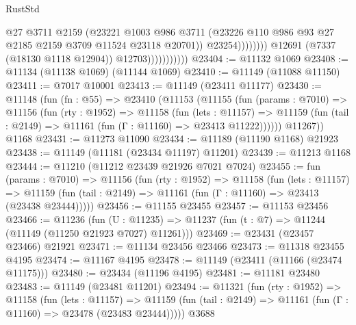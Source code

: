\begin{lexlean}{RustStd}
\begin{coremodule}
                                          @27
                                          @3711
                                          @2159
                                          (@23221
                                            @1003
                                            @986
                                            @3711
                                            (@23226
                                              @110
                                              @986
                                              @93
                                              @27
                                              @2185
                                              @2159
                                              @3709
                                              @11524
                                              @23118
                                              @20701))
                                          @23254))))))))
                          @12691
                          (@7337 (@18130 @1118 @12904))
                          @12703)))))))))))
@23404 := @11132 @1069
@23408 := @11134 (@11138 @1069) (@11144 @1069)
@23410 := @11149 (@11088 @11150)
@23411 := @7017 @10001
@23413 := @11149 (@23411 @11177)
@23430 := @11148
    (fun (fn : @55) =>
    @23410
      (@11153
        (@11155
          (fun (params : @7010) =>
          @11156
            (fun (rty : @1952) =>
            @11158
              (fun (lets : @11157) =>
              @11159 (fun (tail : @2149) => @11161 (fun (Γ : @11160) => @23413 @11222))))))
        @11267))
    @1168
@23431 := @11273 @11090
@23434 := @11189 (@11190 @1168) @21923
@23438 := @11149 (@11181 (@23434 @11197) @11201)
@23439 := @11213 @1168
@23444 := @11210 (@11212 @23439 @21926 @7021 @7024)
@23455 := fun (params : @7010) =>
  @11156
    (fun (rty : @1952) =>
    @11158
      (fun (lets : @11157) =>
      @11159 (fun (tail : @2149) => @11161 (fun (Γ : @11160) => @23413 (@23438 @23444)))))
@23456 := @11155 @23455
@23457 := @11153 @23456
@23466 := @11236
    (fun (U : @11235) => @11237 (fun (t : @7) => @11244 (@11149 (@11250 @21923 @7027) @11261)))
@23469 := @23431 (@23457 @23466) @21921
@23471 := @11134 @23456 @23466
@23473 := @11318 @23455 @4195
@23474 := @11167 @4195
@23478 := @11149 (@23411 (@11166 (@23474 @11175)))
@23480 := @23434 (@11196 @4195)
@23481 := @11181 @23480
@23483 := @11149 (@23481 @11201)
@23494 := @11321
    (fun (rty : @1952) =>
    @11158
      (fun (lets : @11157) =>
      @11159 (fun (tail : @2149) => @11161 (fun (Γ : @11160) => @23478 (@23483 @23444)))))
    @3688

\end{coremodule}
\end{lexlean}
